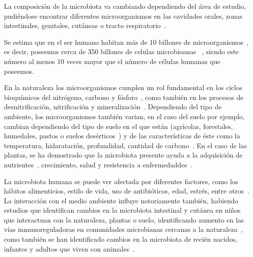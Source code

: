La composición de la microbiota va cambiando dependiendo del área de estudio, pudiéndose encontrar diferentes microorganismos en las cavidades orales, zonas intestinales, genitales, cutáneas o tracto respiratorio~\cite{ursell2012interpersonal}.

Se estima que en el ser humano habitan más de 10 billones de microorganismos~\cite{sender2016revised}, es decir, poseemos cerca de 350 billones de celulas microbioanas~\cite{fijan2014microorganisms,ley2006ecological} , siendo este número al menos 10 veces mayor que el número de células humanas que poseemos.

En la naturaleza los microorganismos cumplen un rol fundamental en los ciclos bioquímicos del nitrógeno, carbono y fósforo~\cite{bitton1994role, gougoulias2014role}, como también en los procesos de desnitrificación, nitrificación y mineralización~\cite{bitton1994role, gougoulias2014role}. 
Dependiendo del tipo de ambiente, los microorganismos también varian, en el caso del suelo por ejemplo, cambian dependiendo del tipo de suelo en el que están (agrícolas, forestales, humedales, pastos o suelos desérticos~\cite{jiao2021linking}) y de las características de éste como la temperatura, hidaratación, profundidad, cantidad de carbono~\cite{bickel2020soil}.
En el caso de las plantas, se ha demostrado que la microbiota presente ayuda a la adquisición de nutrientes~\cite{hu2017probiotic}, crecimiento, salud y resistencia a enfermedaddes~\cite{lemanceau2017let,hardoim2015hidden,vorholt2012microbial,COMPANT201929}.


La microbiota humana se puede ver afectada por diferentes factores, como los hábitos alimenticios, estilo de vida, uso de antibióticos, edad, estrés, entre otros~\cite{altvecs2020interaction}. La interacción con el medio ambiente influye notoriamente también, habiendo estudios que identifican cambios en la microbiota intestinal y cutánea en niños que interactuan con la naturaleza, plantas o suelo, identificando aumento en las vías inmunoreguladoras en comunidades microbianas cercanas a la naturaleza~\cite{roslund2020biodiversity}, como también se han identificado cambios en la microbiota de recién nacidos, infantes y adultos que viven con animales~\cite{tun2017exposure, azad2013infant,kates2020household}.





